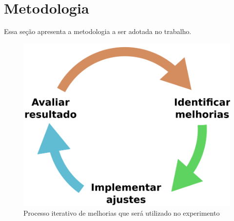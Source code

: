 \chapter{Metodologia}\label{cap:metodologia}

Essa seção apresenta a metodologia a ser adotada no trabalho.

\lipsum[37-38]

\begin{figure}[ht]
    \centering
    \includegraphics[width=0.4\linewidth]{figuras/metodologia.png}
    \caption{Processo iterativo de melhorias que será utilizado no experimento}
    \label{fig:metodologia}
\end{figure}

\lipsum[39-41]